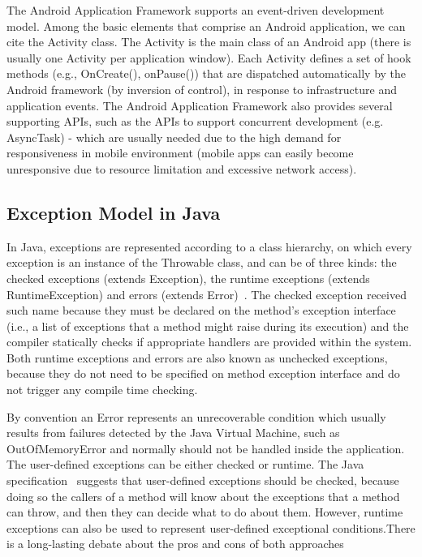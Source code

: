 \documentclass[conference]{IEEEtran}
\begin{document}
The Android Application Framework supports an event-driven development model. 
Among the basic elements that comprise an Android application, we can cite the
 Activity class. The Activity is the main class of an Android app (there is usually one
Activity per application window). Each Activity defines a set of hook methods  
(e.g., OnCreate(), onPause()) that are dispatched automatically by the Android 
framework (by inversion of control), in response to infrastructure and application events.
The Android Application Framework also provides several supporting APIs, such as 
the APIs to support concurrent development (e.g. AsyncTask) - 
which are usually needed due to the high demand for responsiveness 
in mobile environment (mobile apps can easily become 
unresponsive due to resource limitation and excessive network access).



\subsection{Exception Model in Java} \label{sec:extypes}

In Java, exceptions are represented according to a class hierarchy, on which
 every exception is an instance of the Throwable class, and can be of three kinds: the checked exceptions
(extends Exception), the runtime exceptions (extends RuntimeException) and errors
(extends Error)~\cite{gosling2000java}. The checked exception received such name
 because they must be declared on the method's exception interface (i.e., a list of exceptions that a method 
might raise during its execution) and the compiler statically checks if
 appropriate handlers are provided within the system.
Both runtime exceptions and errors are also known as unchecked exceptions, because 
they do not need to be specified on method exception interface and do not trigger any 
compile time checking.

By convention an Error represents an unrecoverable condition which usually results
from failures detected by the Java Virtual Machine, such as OutOfMemoryError and
normally should not be handled inside the application. The user-defined exceptions 
can be either checked or runtime. The Java specification~\cite{gosling2000java} 
suggests that user-defined exceptions should be checked, because doing so 
the callers of a method will know about the exceptions that a method can throw, and then 
they can decide what to do about them. However, runtime exceptions can also be 
used to represent user-defined exceptional conditions.There is a long-lasting debate 
about the pros and cons of both approaches~\cite{javatut,stackoverlow,debate}
\end{document}
